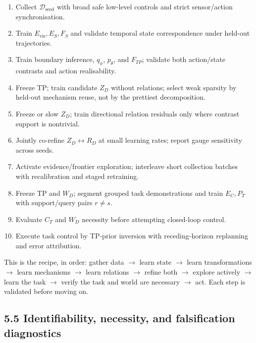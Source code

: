 \documentclass[11pt]{article}
\newenvironment{plainword}{%
  \par\medskip\noindent\begin{minipage}{\textwidth}%
  \color{gray!75!black}\small\itshape
}{%
  \end{minipage}\par\medskip}
\begin{document}
\begin{enumerate}
\item Collect $\mathcal D_{\mathrm{seed}}$ with broad safe low-level controls and strict sensor/action synchronisation.
\item Train $E_{\mathrm{vis}},E_S,F_S$ and validate temporal state correspondence under held-out trajectories.
\item Train boundary inference, $q_\phi$, $p_\theta$, and $F_{TP}$; validate both action/state contrasts and action realisability.
\item Freeze TP; train candidate $Z_D$ without relations; select weak sparsity by held-out mechanism reuse, not by the prettiest
decomposition.
\item Freeze or slow $Z_D$; train directional relation residuals only where contrast support is nontrivial.
\item Jointly co-refine $Z_D\leftrightarrow R_D$ at small learning rates; report gauge sensitivity across seeds.
\item Activate evidence/frontier exploration; interleave short collection batches with recalibration and staged retraining.
\item Freeze TP and $W_D$; segment grouped task demonstrations and train $E_C,P_T$ with support/query pairs $r\neq s$.
\item Evaluate $C_T$ and $W_D$ necessity before attempting closed-loop control.
\item Execute task control by TP-prior inversion with receding-horizon replanning and error attribution.
\end{enumerate}

\begin{plainword}
This is the recipe, in order: gather data $\to$ learn state $\to$ learn transformations $\to$ learn mechanisms $\to$ learn relations
$\to$ refine both $\to$ explore actively $\to$ learn the task $\to$ verify the task and world are necessary $\to$ act. Each step is
validated before moving on.
\end{plainword}

\subsection*{5.5 Identifiability, necessity, and falsification diagnostics}
\end{document}
